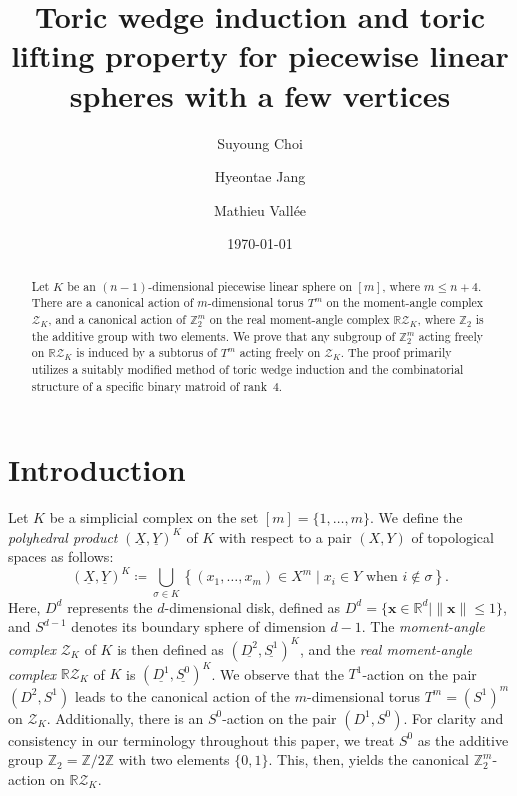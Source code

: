 \documentclass[11pt]{amsart}
\title[Toric wedge induction and toric lifting property]{Toric wedge induction and toric lifting property for piecewise linear spheres with a few vertices}
\author{Suyoung Choi}
\author{Hyeontae Jang}
\author{Mathieu Vall\'ee}
\date{\today}
\theoremstyle{plain}
\numberwithin{equation}{section}
\theoremstyle{definition}
\newcommand{\R}{\mathbb{R}}
\newcommand{\Z}{\mathbb{Z}}
\newcommand{\cZ}{\mathcal{Z}}
\begin{document}
\begin{abstract}
    Let $K$ be an $(n-1)$-dimensional piecewise linear sphere on $[m]$, where $m\leq n+4$.
    There are a canonical action of $m$-dimensional torus $T^m$ on the moment-angle complex $\cZ_K$, and a canonical action of $\Z_2^m$ on the real moment-angle complex $\R\cZ_K$, where $\Z_2$ is the additive group with two elements.
    We prove that any subgroup of $\Z_2^m$ acting freely on $\R\cZ_K$ is induced by a subtorus of $T^m$ acting freely on $\cZ_K$.
    The proof primarily utilizes a suitably modified method of toric wedge induction and the combinatorial structure of a specific binary matroid of rank~$4$.
\end{abstract}
\maketitle

\tableofcontents
\section{Introduction}
Let $K$ be a simplicial complex on the set $[m]=\{1, \ldots, m\}$.
We define the \emph{polyhedral product} $ (\underline{X}, \underline{Y})^K $ of $K$ with respect to a pair $(X, Y)$ of topological spaces as follows:
$$
    (\underline{X}, \underline{Y})^K \coloneqq \bigcup_{\sigma \in K} \left\{ (x_1, \ldots, x_m) \in X^m \mid x_i \in Y \text{ when } i \notin \sigma \right\}.
$$
Here, $D^d$ represents the $d$-dimensional disk, defined as $D^d = \{\mathbf{x} \in \R^d \mid \|\mathbf{x}\| \leq 1\}$, and $S^{d-1}$ denotes its boundary sphere of dimension $d-1$.
The \emph{moment-angle complex} $\cZ_K$ of $K$ is then defined as $(\underline{D^2}, \underline{S^1})^K$, and the \emph{real moment-angle complex} $\R\cZ_K$ of $K$ is $(\underline{D^1}, \underline{S^0})^K$.
We observe that the $T^1$-action on the pair $(D^2, S^1)$ leads to the canonical action of the $m$-dimensional torus $T^m = (S^1)^m$ on $\cZ_K$.
Additionally, there is an $S^0$-action on the pair $(D^1, S^0)$.
For clarity and consistency in our terminology throughout this paper, we treat $S^0$ as the additive group $\Z_2=\Z/2\Z$ with two elements $\{ 0, 1\}$.
This, then, yields the canonical $\Z_2^m$-action on $\R\cZ_K$.
\end{document}
